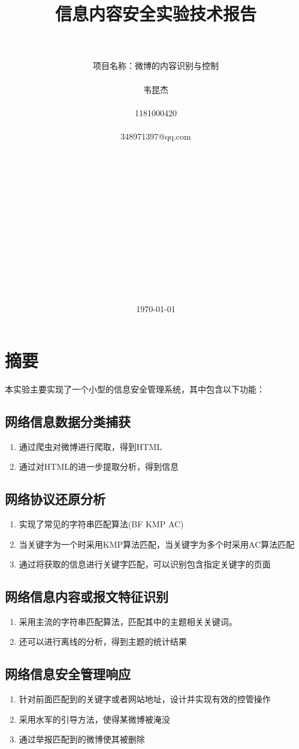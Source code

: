 \documentclass{ctexart}
\title{信息内容安全实验技术报告 }
\author{\\\\项目名称：微博的内容识别与控制\\\\ 韦昆杰  \\\\ 1181000420 \\\\  348971397@qq.com  \\\\\\\\\\\\\\\\\\\\\\\\\\\\}
\date{\today}
\begin{document}
\maketitle
\newpage
\tableofcontents

\section{摘要}
本实验主要实现了一个小型的信息安全管理系统，其中包含以下功能：
\subsection{网络信息数据分类捕获}
\begin{enumerate}
    \item 通过爬虫对微博进行爬取，得到HTML
    \item 通过对HTML的进一步提取分析，得到信息
\end{enumerate}

\subsection{网络协议还原分析}
\begin{enumerate}
    \item 实现了常见的字符串匹配算法(BF KMP AC)
    \item 当关键字为一个时采用KMP算法匹配，当关键字为多个时采用AC算法匹配
    \item 通过将获取的信息进行关键字匹配，可以识别包含指定关键字的页面
\end{enumerate}
\subsection{网络信息内容或报文特征识别}
\begin{enumerate}
    \item 采用主流的字符串匹配算法，匹配其中的主题相关关键词。
    \item 还可以进行离线的分析，得到主题的统计结果
\end{enumerate}

\subsection{网络信息安全管理响应}
\begin{enumerate}
    \item 针对前面匹配到的关键字或者网站地址，设计并实现有效的控管操作
    \item 采用水军的引导方法，使得某微博被淹没
    \item 通过举报匹配到的微博使其被删除
\end{enumerate}
\end{document}
